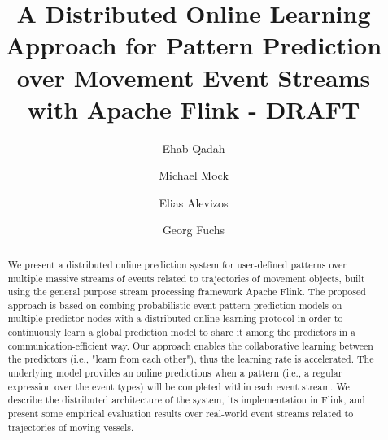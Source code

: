 \documentclass[sigconf,edbt]{acmart-edbt2018}
\begin{document}
\title{A Distributed Online Learning Approach for Pattern Prediction over Movement Event Streams with Apache Flink - DRAFT}

%
  
\author{Ehab Qadah}

\author{Michael Mock}


\author{Elias Alevizos}

\author{Georg Fuchs}

\renewcommand{\shortauthors}{}


\begin{abstract}
We present a distributed online prediction system for user-defined patterns over multiple massive streams of events related to trajectories of movement objects, built using the general purpose stream processing framework Apache Flink. The proposed approach is based on combing probabilistic event pattern prediction models on multiple predictor nodes with a distributed online learning protocol in order to continuously learn a global prediction model to share it among the predictors in a communication-efficient way. Our approach enables the  collaborative learning between the predictors (i.e., "learn from each other"), thus the learning rate is accelerated. The underlying model provides an online predictions when a pattern (i.e., a regular expression over the event types) will be completed within each event stream. We describe the distributed architecture of the system, its implementation in Flink, and present some empirical evaluation results over real-world event streams related to trajectories of moving vessels.

\end{abstract}
\end{document}

